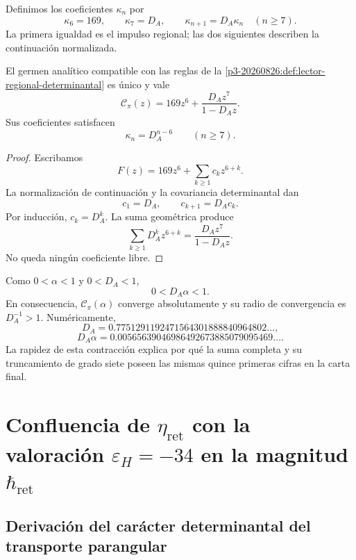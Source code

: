
Definimos los coeficientes \(\kappa_n\) por
\[
\kappa_6=169,
\qquad
\kappa_7=D_A,
\qquad
\kappa_{n+1}=D_A\kappa_n\quad(n\ge7).
\]
La primera igualdad es el impulso regional; las dos siguientes describen la
continuación normalizada.

\begin{theorem}
\label{p3-20260826:thm:realizacion-analitica-graduada}
El germen analítico compatible con las reglas de la
\cref{p3-20260826:def:lector-regional-determinantal} es único y vale
\[
\boxed{
\mathscr C_\pi(z)
=169z^6+\frac{D_Az^7}{1-D_Az}.}
\]
Sus coeficientes satisfacen
\[
\kappa_n=D_A^{n-6}\qquad(n\ge7).
\]
\end{theorem}

\begin{proof}
Escribamos
\[
F(z)=169z^6+\sum_{k\ge1}c_kz^{6+k}.
\]
La normalización de continuación y la covariancia determinantal dan
\[
c_1=D_A,
\qquad
c_{k+1}=D_Ac_k.
\]
Por inducción, \(c_k=D_A^k\). La suma geométrica produce
\[
\sum_{k\ge1}D_A^kz^{6+k}
=\frac{D_Az^7}{1-D_Az}.
\]
No queda ningún coeficiente libre.
\end{proof}

Como \(0<\alpha<1\) y \(0<D_A<1\),
\[
0<D_A\alpha<1.
\]
En consecuencia, \(\mathscr C_\pi(\alpha)\) converge absolutamente y su
radio de convergencia es \(D_A^{-1}>1\). Numéricamente,
\[
D_A=0.7751291192471564301888840964802\ldots,
\]
\[
D_A\alpha=0.00565639046986492673885079095469\ldots.
\]
La rapidez de esta contracción explica por qué la suma completa y su
truncamiento de grado siete poseen las mismas quince primeras cifras en la
carta final.

\section{Confluencia de \texorpdfstring{\(\eta_{\mathrm{ret}}\)}{eta_ret} con la valoración \texorpdfstring{\(\varepsilon_H=-34\)}{epsilon_H=-34} en la magnitud \texorpdfstring{\(\hbar_{\mathrm{ret}}\)}{hbar_ret}}
\label{sec:s102:c38:3}

\subsection{Derivación del carácter determinantal del transporte parangular}
\label{sec:s102:c38:3:1}

